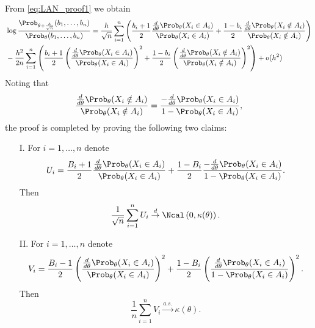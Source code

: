 From \eqref{eq:LAN_proof1} we obtain
\begin{align*}
& \log \frac{ \Prob_{\theta + \frac{h}{\sqrt{n}}}(b_1,\ldots,b_n)} { \Prob_\theta (b_1,\ldots,b_n) }   = \frac{h}{\sqrt{n}} \sum_{i=1}^n  
\left( 
\frac{b_i+1}{2}  \frac{\frac{d}{d\theta} \Prob_{\theta}(X_i \in A_i)}{\Prob_{\theta}(X_i \in A_i)}  + 
 \frac{1-b_i}{2}  \frac{\frac{d}{d\theta} \Prob_{\theta}(X_i \notin A_i)}{\Prob_{\theta}(X_i \notin A_i)}   \right) \\
 & - \frac{h^2}{2n} 
 \sum_{i=1}^n 
\left( 
 \frac{b_i+1}{2} 
\left( \frac{\frac{d}{d\theta} \Prob_{\theta}(X_i \in A_i)}{\Prob_{\theta}(X_i \in A_i)}  \right)^2
+ 
 \frac{1-b_i}{2} \left( \frac{\frac{d}{d\theta} \Prob_{\theta}(X_i \notin A_i)}{\Prob_{\theta}(X_i \notin A_i)}  \right)^2 \right) + o(h^2) \\
\end{align*}
%
Noting that 
\[
\frac{\frac{d}{d\theta} \Prob_{\theta}(X_i \notin A_i)}{\Prob_{\theta}(X_i \notin A_i)} = \frac{-\frac{d}{d\theta} \Prob_{\theta}(X_i \in A_i)}{1-\Prob_{\theta}(X_i \in A_i)},
\]
the proof is completed by proving the following two claims:
\begin{itemize}
\item[I.] 
For $i=1,\ldots,n$ denote 
\[
U_i = \frac{B_i+1}{2}  \frac{\frac{d}{d\theta} \Prob_{\theta}(X_i \in A_i)}{\Prob_{\theta}(X_i \in A_i)}  + 
 \frac{1-B_i}{2}  \frac{-\frac{d}{d\theta} \Prob_{\theta}(X_i \in A_i)}{1-\Prob_{\theta}(X_i \in A_i)}. 
\]
Then 
\[
\frac{1}{\sqrt{n}} \sum_{i=1}^n U_i \overset{d}{\rightarrow} \Ncal\left(0, \kappa(\theta) \right). 
\]
\item[II.]
For $i=1,\ldots,n$ denote 
\[
V_i =  \frac{B_i-1}{2} 
\left( \frac{\frac{d}{d\theta} \Prob_{\theta}(X_i \in A_i)}{\Prob_{\theta}(X_i \in A_i)}  \right)^2
+ 
 \frac{1-B_i}{2} \left( \frac{\frac{d}{d\theta} \Prob_{\theta}(X_i \in A_i)}{1-\Prob_{\theta}(X_i \in A_i)}  \right)^2.
\]
Then 
\[
\frac{1}{n} \sum_{i=1}^n V_i \overset{a.s.}{\rightarrow} \kappa(\theta). 
\]
\end{itemize}
